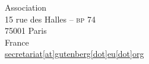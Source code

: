 
\enlargethispage{1.5cm}
\small
\vspace*{-1cm}
\hspace*{-1.5cm}%
%
\hfill%
\begin{minipage}[t]{.5\textwidth}%
  \footnotesize\raggedleft%
  Association \gut{}\\
  15 rue des Halles -- \textsc{bp} 74\\
  75001 Paris\\
  France\\
  \url{secretariat[at]gutenberg[dot]eu[dot]org}
\end{minipage}%

